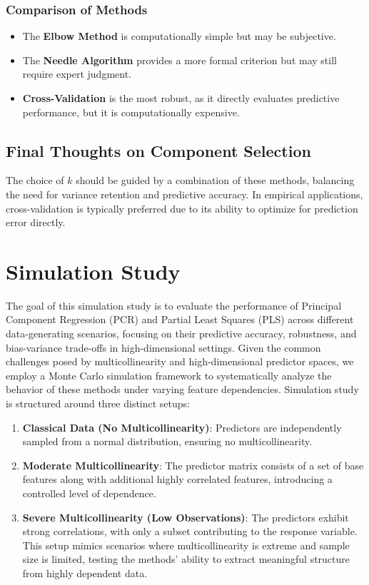 \documentclass[11pt,twoside,a4paper]{article}
\begin{document}
\subsubsection{Comparison of Methods}
\begin{itemize}
    \item The \textbf{Elbow Method} is computationally simple but may be subjective.
    \item The \textbf{Needle Algorithm} provides a more formal criterion but may still require expert judgment.
    \item \textbf{Cross-Validation} is the most robust, as it directly evaluates predictive performance, but it is computationally expensive.
\end{itemize}

\subsection{Final Thoughts on Component Selection}
The choice of \( k \) should be guided by a combination of these methods, balancing the need for variance retention and predictive accuracy. In empirical applications, cross-validation is typically preferred due to its ability to optimize for prediction error directly.
\newpage


\section{Simulation Study}

The goal of this simulation study is to evaluate the performance of Principal Component Regression (PCR) and Partial Least Squares (PLS) across different data-generating scenarios, focusing on their predictive accuracy, robustness, and bias-variance trade-offs in high-dimensional settings. Given the common challenges posed by multicollinearity and high-dimensional predictor spaces, we employ a Monte Carlo simulation framework to systematically analyze the behavior of these methods under varying feature dependencies. Simulation study is structured around three distinct setups:

\begin{enumerate}
    \item \textbf{Classical Data (No Multicollinearity)}: Predictors are independently sampled from a normal distribution, ensuring no multicollinearity.
    \item \textbf{Moderate Multicollinearity}: The predictor matrix consists of a set of base features along with additional highly correlated features, introducing a controlled level of dependence.
    \item \textbf{Severe Multicollinearity (Low Observations)}: The predictors exhibit strong correlations, with only a subset contributing to the response variable. This setup mimics scenarios where multicollinearity is extreme and sample size is limited, testing the methods' ability to extract meaningful structure from highly dependent data.
\end{enumerate}
\end{document}
